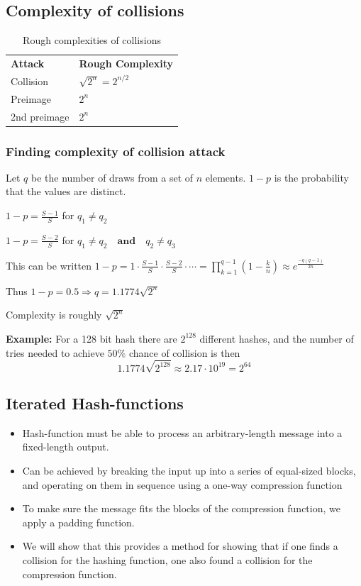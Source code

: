 \subsection{Complexity of collisions}
\begin{table}[H]
  \centering
  \begin{tabular}{ll}
    \textbf{Attack} & \textbf{Rough Complexity} \\
    Collision & $\sqrt{2^n}=2^{n/2}$ \\
    Preimage & $2^n$ \\
    2nd preimage & $2^n$ \\
  \end{tabular}
  \caption{Rough complexities of collisions}
\end{table}

\subsubsection*{Finding complexity of collision attack}
Let $q$ be the number of draws from a set of $n$ elements. $1 - p$ is
the probability that the values are distinct.

$1 - p = \frac{S-1}{S}$ for $q_1 \neq q_2$

$1 - p = \frac{S-2}{S}$ for $q_1 \neq q_2 \mathbf{\quad and \quad} q_2 \neq q_3$

This can be written $1 - p = 1 \cdot \frac{S-1}{S} \cdot \frac{S-2}{S} \cdot \cdots = \prod_{k=1}^{q-1} \left( 1 - \frac{k}{n} \right) \approx e^{\frac{-q(q-1)}{2n}}$

Thus $1 - p = 0.5 \Rightarrow q = 1.1774 \sqrt{2^n}$

Complexity is roughly $\sqrt{2^n}$

\textbf{Example:} For a 128 bit hash there are $2^{128}$ different
hashes, and the number of tries needed to achieve $50\%$ chance of
collision is then
\[ 1.1774 \sqrt{2^{128}} \approx 2.17 \cdot 10^{19} = 2^{64}\]


\subsection{Iterated Hash-functions}
\begin{itemize}
\item Hash-function must be able to process an arbitrary-length
  message into a fixed-length output.
\item Can be achieved by breaking the input up into a series of
  equal-sized blocks, and operating on them in sequence using a
  one-way compression function
\item To make sure the message fits the blocks of the compression
  function, we apply a padding function.
\item We will show that this provides a method for showing that if one
  finds a collision for the hashing function, one also found a
  collision for the compression function.
\end{itemize}

